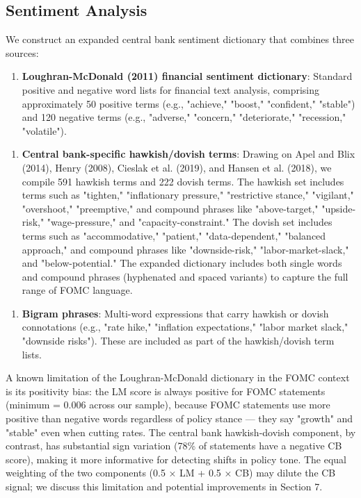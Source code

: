 \subsection{Sentiment Analysis}

We construct an expanded central bank sentiment dictionary that combines three sources:

\begin{enumerate}
\item \textbf{Loughran-McDonald (2011) financial sentiment dictionary}: Standard positive and negative word lists for financial text analysis, comprising approximately 50 positive terms (e.g., "achieve," "boost," "confident," "stable") and 120 negative terms (e.g., "adverse," "concern," "deteriorate," "recession," "volatile").
\end{enumerate}

\begin{enumerate}
\item \textbf{Central bank-specific hawkish/dovish terms}: Drawing on Apel and Blix (2014), Henry (2008), Cieslak et al. (2019), and Hansen et al. (2018), we compile 591 hawkish terms and 222 dovish terms. The hawkish set includes terms such as "tighten," "inflationary pressure," "restrictive stance," "vigilant," "overshoot," "preemptive," and compound phrases like "above-target," "upside-risk," "wage-pressure," and "capacity-constraint." The dovish set includes terms such as "accommodative," "patient," "data-dependent," "balanced approach," and compound phrases like "downside-risk," "labor-market-slack," and "below-potential." The expanded dictionary includes both single words and compound phrases (hyphenated and spaced variants) to capture the full range of FOMC language.
\end{enumerate}

\begin{enumerate}
\item \textbf{Bigram phrases}: Multi-word expressions that carry hawkish or dovish connotations (e.g., "rate hike," "inflation expectations," "labor market slack," "downside risks"). These are included as part of the hawkish/dovish term lists.
\end{enumerate}

A known limitation of the Loughran-McDonald dictionary in the FOMC context is its positivity bias: the LM score is always positive for FOMC statements (minimum = 0.006 across our sample), because FOMC statements use more positive than negative words regardless of policy stance --- they say "growth" and "stable" even when cutting rates. The central bank hawkish-dovish component, by contrast, has substantial sign variation (78\% of statements have a negative CB score), making it more informative for detecting shifts in policy tone. The equal weighting of the two components (0.5 × LM + 0.5 × CB) may dilute the CB signal; we discuss this limitation and potential improvements in Section 7.


